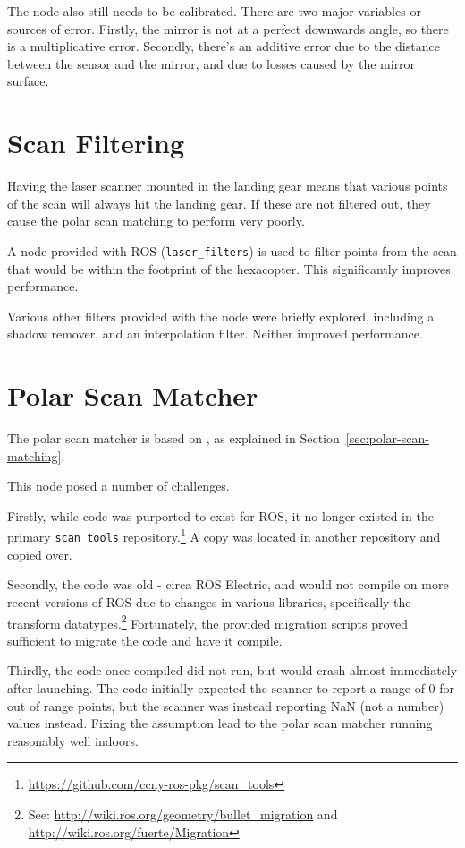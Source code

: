 \documentclass[12pt,oneside,a4paper]{book}
\begin{document}
The node also still needs to be calibrated. There are two major
variables or sources of error.  Firstly, the mirror is not at a
perfect downwards angle, so there is a multiplicative error. Secondly,
there's an additive error due to the distance between the sensor and
the mirror, and due to losses caused by the mirror surface.

\section{Scan Filtering}
\label{sec:scan-filtering}

Having the laser scanner mounted in the landing gear means that
various points of the scan will always hit the landing gear. If these
are not filtered out, they cause the polar scan matching to perform
very poorly.

A node provided with ROS (\texttt{laser\_filters}) is used to filter
points from the scan that would be within the footprint of the
hexacopter. This significantly improves performance.

Various other filters provided with the node were briefly explored,
including a shadow remover, and an interpolation filter. Neither
improved performance.

\section{Polar Scan Matcher}
\label{sec:polar-scan-matcher}

The polar scan matcher is based on \cite{polarscanmatching}, as
explained in Section~\ref{sec:polar-scan-matching}.

This node posed a number of challenges.

Firstly, while code was purported to exist for ROS, it no longer
existed in the primary \texttt{scan\_tools}
repository.\footnote{\url{https://github.com/ccny-ros-pkg/scan_tools}} A
copy was located in another repository and copied over.

Secondly, the code was old - circa ROS Electric, and would not compile
on more recent versions of ROS due to changes in various libraries,
specifically the transform datatypes.\footnote{See:
  \url{http://wiki.ros.org/geometry/bullet_migration} and
  \url{http://wiki.ros.org/fuerte/Migration}} Fortunately, the
provided migration scripts proved sufficient to migrate the code and
have it compile.

Thirdly, the code once compiled did not run, but would crash almost
immediately after launching. The code initially expected the scanner
to report a range of 0 for out of range points, but the scanner was
instead reporting NaN (not a number) values instead. Fixing the
assumption lead to the polar scan matcher running reasonably well
indoors.
\end{document}
